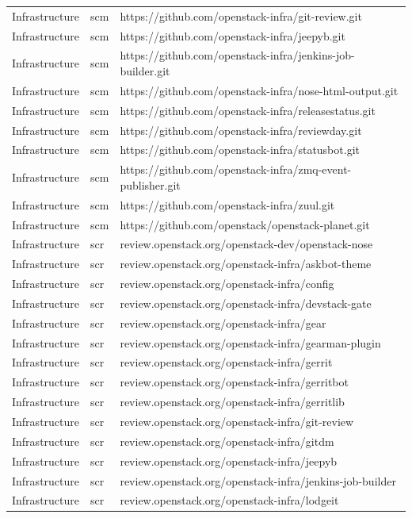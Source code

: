 \documentclass[a4wide,11pt]{report}
\begin{document}
\begin{center}
\begin{longtable}{|p{4cm}|p{1cm}|p{10cm}|}
Infrastructure&scm&https://github.com/openstack-infra/git-review.git\\ 
Infrastructure&scm&https://github.com/openstack-infra/jeepyb.git\\ 
Infrastructure&scm&https://github.com/openstack-infra/jenkins-job-builder.git\\ 
Infrastructure&scm&https://github.com/openstack-infra/nose-html-output.git\\ 
Infrastructure&scm&https://github.com/openstack-infra/releasestatus.git\\ 
Infrastructure&scm&https://github.com/openstack-infra/reviewday.git\\ 
Infrastructure&scm&https://github.com/openstack-infra/statusbot.git\\ 
Infrastructure&scm&https://github.com/openstack-infra/zmq-event-publisher.git\\ 
Infrastructure&scm&https://github.com/openstack-infra/zuul.git\\ 
Infrastructure&scm&https://github.com/openstack/openstack-planet.git\\ 
Infrastructure&scr&review.openstack.org/openstack-dev/openstack-nose\\ 
Infrastructure&scr&review.openstack.org/openstack-infra/askbot-theme\\ 
Infrastructure&scr&review.openstack.org/openstack-infra/config\\ 
Infrastructure&scr&review.openstack.org/openstack-infra/devstack-gate\\ 
Infrastructure&scr&review.openstack.org/openstack-infra/gear\\ 
Infrastructure&scr&review.openstack.org/openstack-infra/gearman-plugin\\ 
Infrastructure&scr&review.openstack.org/openstack-infra/gerrit\\ 
Infrastructure&scr&review.openstack.org/openstack-infra/gerritbot\\ 
Infrastructure&scr&review.openstack.org/openstack-infra/gerritlib\\ 
Infrastructure&scr&review.openstack.org/openstack-infra/git-review\\ 
Infrastructure&scr&review.openstack.org/openstack-infra/gitdm\\ 
Infrastructure&scr&review.openstack.org/openstack-infra/jeepyb\\ 
Infrastructure&scr&review.openstack.org/openstack-infra/jenkins-job-builder\\ 
Infrastructure&scr&review.openstack.org/openstack-infra/lodgeit\\ 

\end{longtable}
\end{center}
\end{document}
